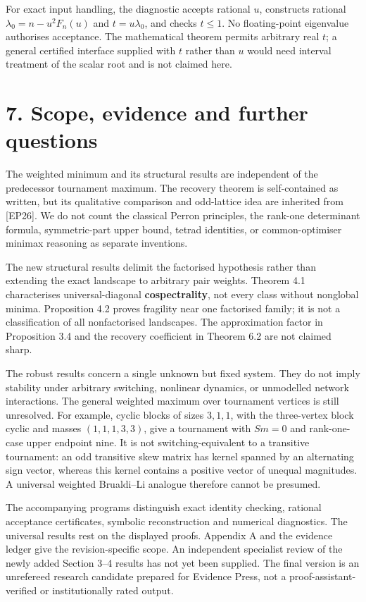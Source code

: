 \documentclass[
  11pt,
  a4paper,
]{article}
\begin{document}
For exact input handling, the diagnostic accepts rational \(u\),
constructs rational \(\lambda_0=n-u^2F_n(u)\) and \(t=u\lambda_0\), and
checks \(t\le1\). No floating-point eigenvalue authorises acceptance.
The mathematical theorem permits arbitrary real \(t\); a general
certified interface supplied with \(t\) rather than \(u\) would need
interval treatment of the scalar root and is not claimed here.

\section{7. Scope, evidence and further
questions}\label{scope-evidence-and-further-questions}

The weighted minimum and its structural results are independent of the
predecessor tournament maximum. The recovery theorem is self-contained
as written, but its qualitative comparison and odd-lattice idea are
inherited from {[}EP26{]}. We do not count the classical Perron
principles, the rank-one determinant formula, symmetric-part upper
bound, tetrad identities, or common-optimiser minimax reasoning as
separate inventions.

The new structural results delimit the factorised hypothesis rather than
extending the exact landscape to arbitrary pair weights. Theorem 4.1
characterises universal-diagonal \textbf{cospectrality}, not every class
without nonglobal minima. Proposition 4.2 proves fragility near one
factorised family; it is not a classification of all nonfactorised
landscapes. The approximation factor in Proposition 3.4 and the recovery
coefficient in Theorem 6.2 are not claimed sharp.

The robust results concern a single unknown but fixed system. They do
not imply stability under arbitrary switching, nonlinear dynamics, or
unmodelled network interactions. The general weighted maximum over
tournament vertices is still unresolved. For example, cyclic blocks of
sizes \(3,1,1\), with the three-vertex block cyclic and masses
\((1,1,1,3,3)\), give a tournament with \(Sm=0\) and rank-one-case upper
endpoint nine. It is not switching-equivalent to a transitive
tournament: an odd transitive skew matrix has kernel spanned by an
alternating sign vector, whereas this kernel contains a positive vector
of unequal magnitudes. A universal weighted Brualdi--Li analogue
therefore cannot be presumed.

The accompanying programs distinguish exact identity checking, rational
acceptance certificates, symbolic reconstruction and numerical
diagnostics. The universal results rest on the displayed proofs.
Appendix A and the evidence ledger give the revision-specific scope. An
independent specialist review of the newly added Section 3--4 results
has not yet been supplied. The final version is an unrefereed research
candidate prepared for Evidence Press, not a proof-assistant-verified or
institutionally rated output.
\end{document}
